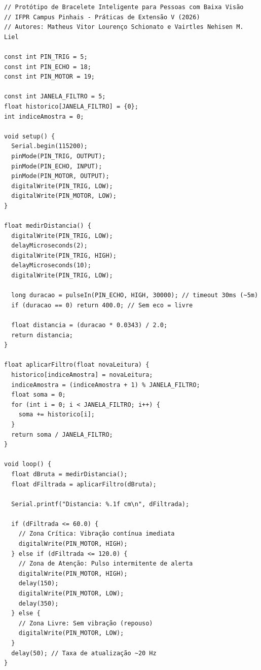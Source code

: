 \begin{verbatim}
// Protótipo de Bracelete Inteligente para Pessoas com Baixa Visão
// IFPR Campus Pinhais - Práticas de Extensão V (2026)
// Autores: Matheus Vitor Lourenço Schionato e Vairtles Nehisen M. Liel

const int PIN_TRIG = 5;
const int PIN_ECHO = 18;
const int PIN_MOTOR = 19;

const int JANELA_FILTRO = 5;
float historico[JANELA_FILTRO] = {0};
int indiceAmostra = 0;

void setup() {
  Serial.begin(115200);
  pinMode(PIN_TRIG, OUTPUT);
  pinMode(PIN_ECHO, INPUT);
  pinMode(PIN_MOTOR, OUTPUT);
  digitalWrite(PIN_TRIG, LOW);
  digitalWrite(PIN_MOTOR, LOW);
}

float medirDistancia() {
  digitalWrite(PIN_TRIG, LOW);
  delayMicroseconds(2);
  digitalWrite(PIN_TRIG, HIGH);
  delayMicroseconds(10);
  digitalWrite(PIN_TRIG, LOW);

  long duracao = pulseIn(PIN_ECHO, HIGH, 30000); // timeout 30ms (~5m)
  if (duracao == 0) return 400.0; // Sem eco = livre

  float distancia = (duracao * 0.0343) / 2.0;
  return distancia;
}

float aplicarFiltro(float novaLeitura) {
  historico[indiceAmostra] = novaLeitura;
  indiceAmostra = (indiceAmostra + 1) % JANELA_FILTRO;
  float soma = 0;
  for (int i = 0; i < JANELA_FILTRO; i++) {
    soma += historico[i];
  }
  return soma / JANELA_FILTRO;
}

void loop() {
  float dBruta = medirDistancia();
  float dFiltrada = aplicarFiltro(dBruta);

  Serial.printf("Distancia: %.1f cm\n", dFiltrada);

  if (dFiltrada <= 60.0) {
    // Zona Crítica: Vibração contínua imediata
    digitalWrite(PIN_MOTOR, HIGH);
  } else if (dFiltrada <= 120.0) {
    // Zona de Atenção: Pulso intermitente de alerta
    digitalWrite(PIN_MOTOR, HIGH);
    delay(150);
    digitalWrite(PIN_MOTOR, LOW);
    delay(350);
  } else {
    // Zona Livre: Sem vibração (repouso)
    digitalWrite(PIN_MOTOR, LOW);
  }
  delay(50); // Taxa de atualização ~20 Hz
}
\end{verbatim}